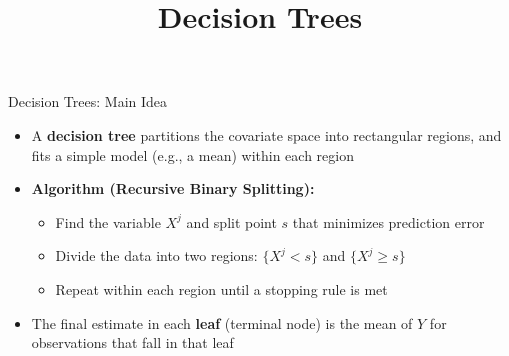 \documentclass[hyperref={pdfpagelabels=false}]{beamer}
\begin{document}
\title[]
{Decision Trees}

\author{}
\institute{}
\date{}

\begin{frame}{}
	\titlepage
\end{frame}




\begin{frame}{Decision Trees: Main Idea}
	\begin{itemize}
		\item A \textbf{decision tree} partitions the covariate space into rectangular regions, and fits a simple model (e.g., a mean) within each region
		\vspace{0.3cm}
		\item \textbf{Algorithm (Recursive Binary Splitting):}
		\vspace{0.2cm}
		\begin{itemize}
			\item[1] Find the variable $X^j$ and split point $s$ that minimizes prediction error
			\vspace{0.2cm}
			\item[2] Divide the data into two regions: $\{X^j < s\}$ and $\{X^j \geq s\}$
			\vspace{0.2cm}
			\item[3] Repeat within each region until a stopping rule is met
		\end{itemize}
		\vspace{0.3cm}
		\item The final estimate in each \textbf{leaf} (terminal node) is the mean of $Y$ for observations that fall in that leaf
	\end{itemize}
\end{frame}
\end{document}
